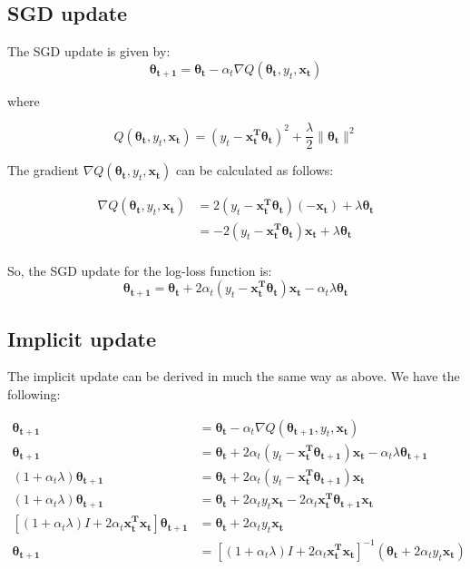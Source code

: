\documentclass{article}
\renewcommand{\vec}[1]{\boldsymbol{#1}}
\begin{document}
\subsection{SGD update}

The SGD update is given by:
\begin{equation}
\vec{\theta_{t+1}} = \vec{\theta_{t}} - \alpha_{t}\nabla Q(\vec{\theta_{t}}, y_t, \vec{x_t})
\end{equation}

where

\begin{equation}
Q(\vec{\theta_{t}}, y_t, \vec{x_t}) = \left(y_t - \vec{x_t^T}\vec{\theta_t}\right)^2 + \frac{\lambda}{2}\|\vec{\theta_t}\|^2
\end{equation}

The gradient $\nabla Q(\vec{\theta_{t}}, y_t, \vec{x_t})$ can be calculated as follows:

\begin{align*}
\nabla Q(\vec{\theta_{t}}, y_t, \vec{x_t}) &= 2\left(y_t - \vec{x_t^T}\vec{\theta_t}\right)\left(-\vec{x_t}\right) + \lambda\vec{\theta_t}\\
&= -2(y_t-\vec{x_t^T}\vec{\theta_t})\vec{x_t} + \lambda\vec{\theta_t}\\
\end{align*}

So, the SGD update for the log-loss function is:
\begin{equation}
\vec{\theta_{t+1}} = \vec{\theta_{t}} +2 \alpha_{t}\left( y_t-\vec{x_t^T}\vec{\theta_t} \right )\vec{x_t} - \alpha_t\lambda\vec{\theta_t}
\end{equation}


\subsection{Implicit update}

The implicit update can be derived in much the same way as above. We have the following:

\begin{align*}
\vec{\theta_{t+1}} &= \vec{\theta_t} - \alpha_t \nabla Q(\vec{\theta_{t+1}}, y_t, \vec{x_t})\\
\vec{\theta_{t+1}} &= \vec{\theta_{t}} +2 \alpha_{t}\left( y_t-\vec{x_t^T}\vec{\theta_{t+1}} \right )\vec{x_t} - \alpha_t\lambda\vec{\theta_{t+1}}\\
(1+\alpha_t\lambda)\vec{\theta_{t+1}} &= \vec{\theta_{t}} +2 \alpha_{t}\left( y_t-\vec{x_t^T}\vec{\theta_{t+1}} \right )\vec{x_t}\\
(1+\alpha_t\lambda)\vec{\theta_{t+1}} &= \vec{\theta_{t}} + 2\alpha_t y_t \vec{x_t} - 2\alpha_t\vec{x_t^T}\vec{\theta_{t+1}}\vec{x_t}\\
\left[(1+\alpha_t\lambda)I + 2\alpha_t\vec{x_t^T}\vec{x_t}\right]\vec{\theta_{t+1}} &= \vec{\theta_t} + 2\alpha_t y_t\vec{x_t}\\
\vec{\theta_{t+1}} &= \left[(1+\alpha_t\lambda)I + 2\alpha_t\vec{x_t^T}\vec{x_t}\right]^{-1}\left(\vec{\theta_t} + 2\alpha_t y_t \vec{x_t}\right)
\end{align*}
\end{document}
